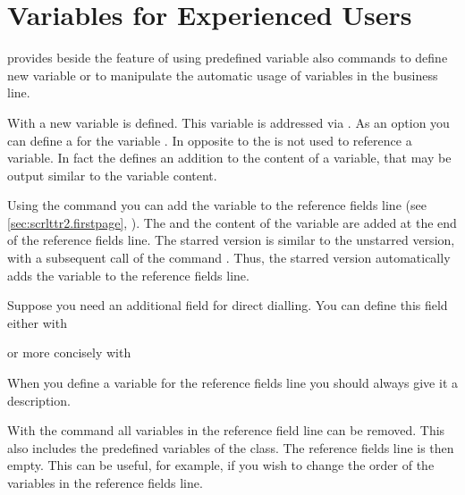 \section{Variables for Experienced Users}
\BeginIndexGroup
{}

\KOMAScript{} provides beside the feature of using predefined variable also
commands to define new variable or to manipulate the automatic usage of
variables in the business line.

\begin{Declaration}
\end{Declaration}
With  a new variable is defined. This variable is
addressed via . As an option you can define a
 for the variable . In opposite to 
the  is not used to reference a variable. In fact the
 defines an addition to the content of a variable, that may
be output similar to the variable content.

Using the command  you can add the variable 
to the reference fields line (see
\autoref{sec:scrlttr2.firstpage},
). The  and the
content of the variable are added at the end of the reference fields line. The
starred version  is similar to the unstarred version, with
a subsequent call of the command . Thus, the starred
version automatically adds the variable to the reference fields line.
\begin{Example}
  Suppose you need an additional field for direct dialling. You can
  define this field either with
\begin{lstcode}
\end{lstcode}
  or more concisely with
\begin{lstcode}
\end{lstcode}
\end{Example}
When you define a variable for the reference fields line
you should always give it a description.

With the command  all variables in the reference field
line can be removed. This also includes the predefined variables of the
class. The reference fields line is then empty. This can be useful, for
example, if you wish to change the order of the variables in the reference
fields line.

